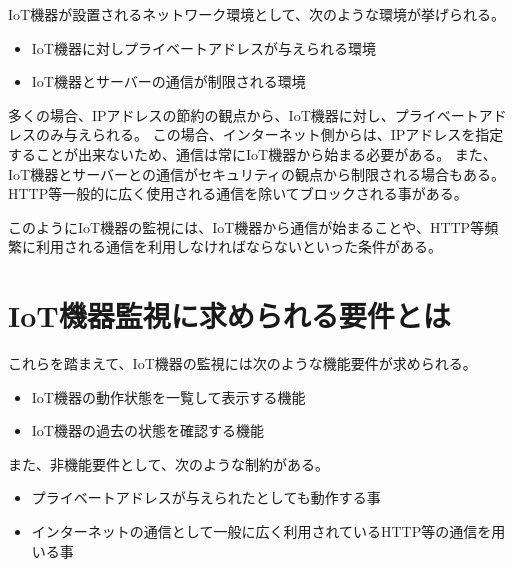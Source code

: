 IoT機器が設置されるネットワーク環境として、次のような環境が挙げられる。
\begin{itemize}
	\item IoT機器に対しプライベートアドレスが与えられる環境
	\item IoT機器とサーバーの通信が制限される環境
\end{itemize}

多くの場合、IPアドレスの節約の観点から、IoT機器に対し、プライベートアドレスのみ与えられる。
この場合、インターネット側からは、IPアドレスを指定することが出来ないため、通信は常にIoT機器から始まる必要がある。
また、IoT機器とサーバーとの通信がセキュリティの観点から制限される場合もある。
HTTP等一般的に広く使用される通信を除いてブロックされる事がある。

このようにIoT機器の監視には、IoT機器から通信が始まることや、HTTP等頻繁に利用される通信を利用しなければならないといった条件がある。

\section{IoT機器監視に求められる要件とは}
これらを踏まえて、IoT機器の監視には次のような機能要件が求められる。
\begin{itemize}
	\item IoT機器の動作状態を一覧して表示する機能
	\item IoT機器の過去の状態を確認する機能
\end{itemize}
また、非機能要件として、次のような制約がある。
\begin{itemize}
	\item プライベートアドレスが与えられたとしても動作する事
	\item インターネットの通信として一般に広く利用されているHTTP等の通信を用いる事
\end{itemize}

